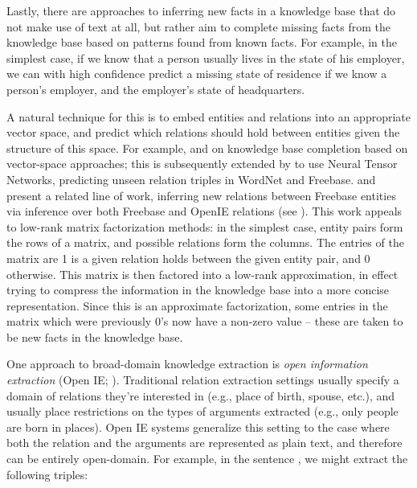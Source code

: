 Lastly, there are approaches to inferring new facts in a knowledge base that do not
  make use of text at all, but rather aim to complete missing facts from the knowledge
  base based on patterns found from known facts.
For example, in the simplest case, if we know that a person usually lives in the state 
  of his employer, we can with high confidence predict a missing state of residence if
  we know a person's employer, and the employer's state of headquarters.

A natural technique for this is to embed entities and relations into an
  appropriate vector space, and predict which relations should hold 
  between entities given the structure of this space.
For example,
   and
   on knowledge base completion based on vector-space
  approaches; this is subsequently extended by  to
  use Neural Tensor Networks, predicting unseen relation triples in
  WordNet and Freebase.
 and 
  present a related line of work, inferring new relations between
  Freebase entities via inference over both Freebase and
  OpenIE relations (see ).
This work appeals to low-rank matrix factorization methods:
  in the simplest case, entity pairs form the rows of a matrix, and possible relations
  form the columns.
The entries of the matrix are 1 is a given relation holds between the given entity pair,
  and 0 otherwise.
This matrix is then factored into a low-rank approximation, in effect trying to compress
  the information in the knowledge base into a more concise representation.
Since this is an approximate factorization, some entries in the matrix which were previously
  0's now have a non-zero value -- these are taken to be new facts in the knowledge base.



%
%
One approach to broad-domain knowledge extraction is \textit{open information extraction} 
(Open IE; ).
Traditional relation extraction settings usually specify a domain of relations they're
  interested in (e.g., place of birth, spouse, etc.), and usually place restrictions on the
  types of arguments extracted (e.g., only people are born in places).
Open IE systems generalize this setting to the case where both the relation and the arguments
  are represented as plain text, and therefore can be entirely open-domain.
For example, in the sentence , we might extract
  the following triples:

